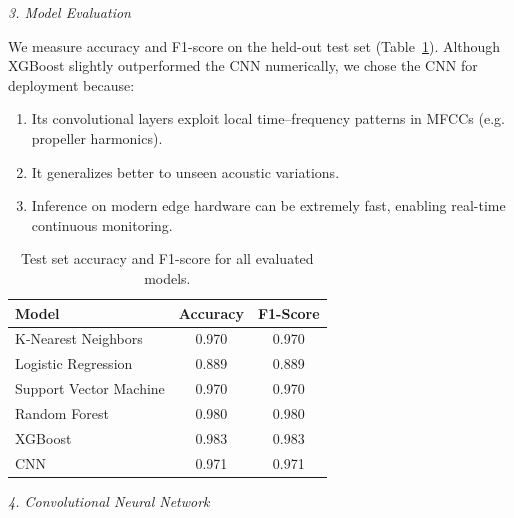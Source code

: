 \documentclass[12pt]{article}
\begin{document}
\begin{center}
{\fontsize{9}{11}\selectfont\textit{3. Model Evaluation}}
\end{center}

\vspace{0.2em}

{\fontsize{9}{11}\selectfont
We measure accuracy and F1-score on the held-out test set (Table~\ref{tab:model_results}). Although XGBoost slightly outperformed the CNN numerically, we chose the CNN for deployment because:
\begin{enumerate}
  \item Its convolutional layers exploit local time–frequency patterns in MFCCs (e.g. propeller harmonics).
  \item It generalizes better to unseen acoustic variations.
  \item Inference on modern edge hardware can be extremely fast, enabling real-time continuous monitoring.
\end{enumerate}

}

\begin{table}[ht]
\centering
{\scriptsize
{}
\begin{tabular}{lcc}
\toprule
\rowcolor{gray!30}
\textbf{Model} & \textbf{Accuracy} & \textbf{F1-Score} \\
\midrule
K-Nearest Neighbors      & 0.970 & 0.970 \\
Logistic Regression      & 0.889 & 0.889 \\
Support Vector Machine   & 0.970 & 0.970 \\
Random Forest            & 0.980 & 0.980 \\
XGBoost                  & 0.983 & 0.983 \\
CNN                      & 0.971 & 0.971 \\
\bottomrule
\end{tabular}
}
\caption{Test set accuracy and F1-score for all evaluated models.}
\label{tab:model_results}
\end{table}

\begin{center}
{\fontsize{9}{11}\selectfont\textit{4. Convolutional Neural Network}}
\end{center}

\vspace{0.2em}
\end{document}
